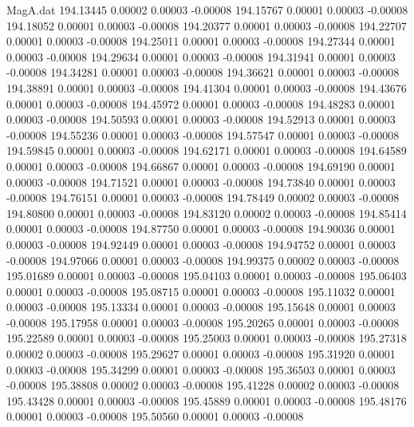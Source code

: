 \begin{filecontents}{MagA.dat}
 194.13445    0.00002    0.00003   -0.00008
 194.15767    0.00001    0.00003   -0.00008
 194.18052    0.00001    0.00003   -0.00008
 194.20377    0.00001    0.00003   -0.00008
 194.22707    0.00001    0.00003   -0.00008
 194.25011    0.00001    0.00003   -0.00008
 194.27344    0.00001    0.00003   -0.00008
 194.29634    0.00001    0.00003   -0.00008
 194.31941    0.00001    0.00003   -0.00008
 194.34281    0.00001    0.00003   -0.00008
 194.36621    0.00001    0.00003   -0.00008
 194.38891    0.00001    0.00003   -0.00008
 194.41304    0.00001    0.00003   -0.00008
 194.43676    0.00001    0.00003   -0.00008
 194.45972    0.00001    0.00003   -0.00008
 194.48283    0.00001    0.00003   -0.00008
 194.50593    0.00001    0.00003   -0.00008
 194.52913    0.00001    0.00003   -0.00008
 194.55236    0.00001    0.00003   -0.00008
 194.57547    0.00001    0.00003   -0.00008
 194.59845    0.00001    0.00003   -0.00008
 194.62171    0.00001    0.00003   -0.00008
 194.64589    0.00001    0.00003   -0.00008
 194.66867    0.00001    0.00003   -0.00008
 194.69190    0.00001    0.00003   -0.00008
 194.71521    0.00001    0.00003   -0.00008
 194.73840    0.00001    0.00003   -0.00008
 194.76151    0.00001    0.00003   -0.00008
 194.78449    0.00002    0.00003   -0.00008
 194.80800    0.00001    0.00003   -0.00008
 194.83120    0.00002    0.00003   -0.00008
 194.85414    0.00001    0.00003   -0.00008
 194.87750    0.00001    0.00003   -0.00008
 194.90036    0.00001    0.00003   -0.00008
 194.92449    0.00001    0.00003   -0.00008
 194.94752    0.00001    0.00003   -0.00008
 194.97066    0.00001    0.00003   -0.00008
 194.99375    0.00002    0.00003   -0.00008
 195.01689    0.00001    0.00003   -0.00008
 195.04103    0.00001    0.00003   -0.00008
 195.06403    0.00001    0.00003   -0.00008
 195.08715    0.00001    0.00003   -0.00008
 195.11032    0.00001    0.00003   -0.00008
 195.13334    0.00001    0.00003   -0.00008
 195.15648    0.00001    0.00003   -0.00008
 195.17958    0.00001    0.00003   -0.00008
 195.20265    0.00001    0.00003   -0.00008
 195.22589    0.00001    0.00003   -0.00008
 195.25003    0.00001    0.00003   -0.00008
 195.27318    0.00002    0.00003   -0.00008
 195.29627    0.00001    0.00003   -0.00008
 195.31920    0.00001    0.00003   -0.00008
 195.34299    0.00001    0.00003   -0.00008
 195.36503    0.00001    0.00003   -0.00008
 195.38808    0.00002    0.00003   -0.00008
 195.41228    0.00002    0.00003   -0.00008
 195.43428    0.00001    0.00003   -0.00008
 195.45889    0.00001    0.00003   -0.00008
 195.48176    0.00001    0.00003   -0.00008
 195.50560    0.00001    0.00003   -0.00008

\end{filecontents}
